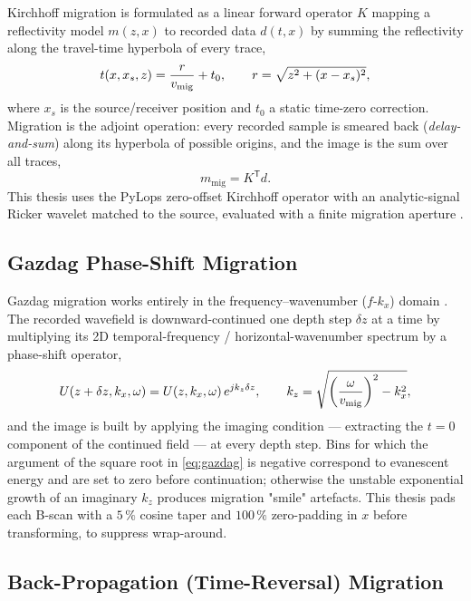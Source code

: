 Kirchhoff migration is formulated as a linear forward operator $K$ mapping a
reflectivity model $m(z,x)$ to recorded data $d(t,x)$ by summing the
reflectivity along the travel-time hyperbola of every trace,
\begin{equation}
  t(x, x_s, z) = \frac{r}{v_{\mathrm{mig}}} + t_0 ,\qquad r = \sqrt{z^2 + (x-x_s)^2},
  \label{eq:kirchhoff-traveltime}
\end{equation}
where $x_s$ is the source/receiver position and $t_0$ a static time-zero
correction. Migration is the adjoint operation: every recorded sample is
smeared back (\emph{delay-and-sum}) along its hyperbola of possible
origins, and the image is the sum over all traces,
\begin{equation}
  m_{\mathrm{mig}} = K^{\mathsf{T}} d .
  \label{eq:kirchhoff-adjoint}
\end{equation}
This thesis uses the PyLops zero-offset Kirchhoff operator with an
analytic-signal Ricker wavelet matched to the source, evaluated with a finite
migration aperture \citep{schneider1978}.

\subsection{Gazdag Phase-Shift Migration}

Gazdag migration works entirely in the frequency--wavenumber ($f$-$k_x$)
domain \citep{gazdag1978}. The recorded wavefield is downward-continued one
depth step $\delta z$ at a time by multiplying its 2D temporal-frequency /
horizontal-wavenumber spectrum by a phase-shift operator,
\begin{equation}
  U(z+\delta z, k_x, \omega) = U(z, k_x,\omega)\, e^{j k_z \delta z},
  \qquad
  k_z = \sqrt{\left(\frac{\omega}{v_{\mathrm{mig}}}\right)^2 - k_x^2},
  \label{eq:gazdag}
\end{equation}
and the image is built by applying the imaging condition --- extracting the
$t=0$ component of the continued field --- at every depth step. Bins for
which the argument of the square root in \cref{eq:gazdag} is negative
correspond to evanescent energy and are set to zero before continuation;
otherwise the unstable exponential growth of an imaginary $k_z$ produces
migration "smile" artefacts. This thesis pads each B-scan with a $5\,\%$
cosine taper and $100\,\%$ zero-padding in $x$ before transforming, to
suppress wrap-around.

\subsection{Back-Propagation (Time-Reversal) Migration}

